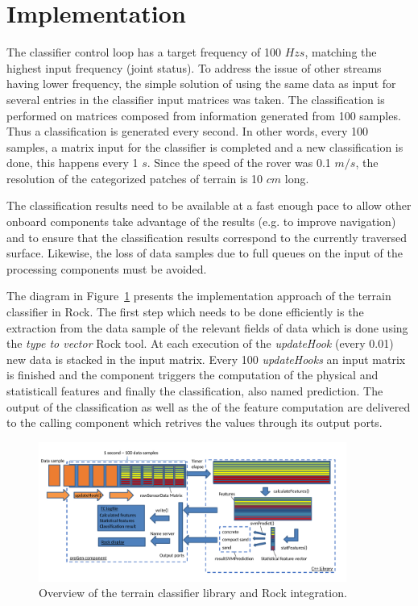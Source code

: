 \documentclass{article}
\begin{document}
\section{Implementation}

The classifier control loop has a target frequency of 100 $Hzs$, matching the highest input frequency (joint status). 
To address the issue of other streams having lower frequency, the simple solution of using the same data as input for several entries in the classifier input matrices was taken. 
The classification is performed on matrices composed from information generated from 100 samples. 
Thus a classification is generated every second.
In other words, every 100 samples, a matrix input for the classifier is completed and a new classification is done, this happens every 1 $s$.
Since the speed of the rover was 0.1 $m/s$, the resolution of the categorized patches of terrain is 10 $cm$ long.  


The classification results need to be available at a fast enough pace to allow other onboard components take advantage of the results (e.g. to improve navigation) and to ensure that the classification results correspond to the currently traversed surface. 
Likewise, the loss of data samples due to full queues on the input of the processing components must be avoided. 

The diagram in Figure~\ref{fig:overview} presents the implementation approach of the terrain classifier in Rock. 
The first step which needs to be done efficiently is the extraction from the data sample of the relevant fields of data which is done using the \emph{type to vector} Rock tool.
At each execution of the \emph{updateHook} (every 0.01) new data is stacked in the input matrix.
Every 100 \emph{updateHooks} an input matrix is finished and the component triggers the computation of the physical and statisticall features and finally the classification, also named prediction.
The output of the classification as well as the of the feature computation are delivered to the calling component which retrives the values through its output ports. 

\begin{figure}[!htbp]
    \centering
    \includegraphics[width=0.9\textwidth]{../figures/OverviewTC2.pdf}
    \caption{\label{fig:overview}Overview of the terrain classifier library and Rock integration.}
\end{figure}
\end{document}
